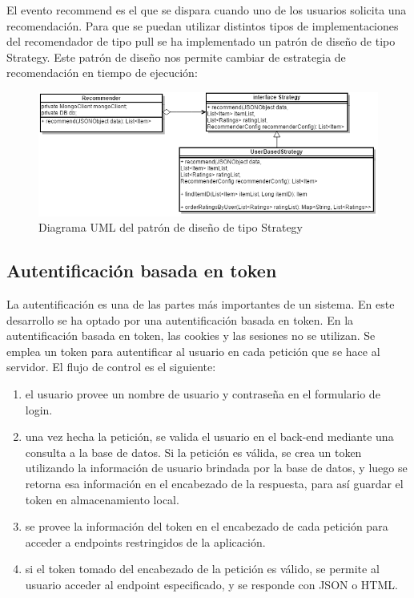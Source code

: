 El evento recommend es el que se dispara cuando uno de los usuarios solicita una recomendación. Para que se puedan utilizar distintos tipos de implementaciones del recomendador de tipo pull se ha implementado un patrón de diseño de tipo Strategy. Este patrón de diseño nos permite cambiar de estrategia de recomendación en tiempo de ejecución:

\begin{figure}[H]
\includegraphics[scale=0.65]{imagenes/uml.png}
\caption{Diagrama UML del patrón de diseño de tipo Strategy}
\label{diagramaUMLStrategy}
\end{figure}

\subsection{Autentificación basada en token}

La autentificación es una de las partes más importantes de un sistema. En este desarrollo se ha optado por una autentificación basada en token. En la autentificación basada en token, las cookies y las sesiones no se utilizan. Se emplea un token para autentificar al usuario en cada petición que se hace al servidor. El flujo de control es el siguiente:
\begin{enumerate}[1.]
	\item el usuario provee un nombre de usuario y contraseña en el formulario de login.
	\item una vez hecha la petición, se valida el usuario en el back-end mediante una consulta a la base de datos. Si la petición es válida, se crea un token utilizando la información de usuario brindada por la base de datos, y luego se retorna esa información en el encabezado de la respuesta, para así guardar el token en almacenamiento local.
	\item se provee la información del token en el encabezado de cada petición para acceder a endpoints restringidos de la aplicación.
	\item si el token tomado del encabezado de la petición es válido, se permite al usuario acceder al endpoint especificado, y se responde con JSON o HTML.
\end{enumerate}

